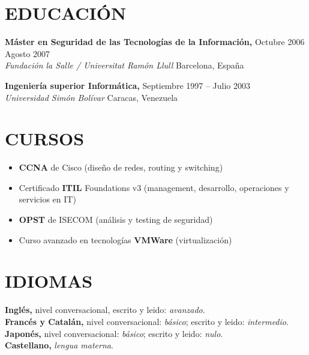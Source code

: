 \documentclass[line,margin]{res}
\begin{document}
\begin{resume}
\section{EDUCACI\'{O}N}
               \textbf{M\'{a}ster en Seguridad de las Tecnolog\'{i}as de la 
               Informaci\'{o}n,} \hfill Octubre 2006  Agosto 2007 \\
               \textit{Fundaci\'{o}n la Salle / Universitat Ram\'{o}n Llull} 
               \hfill Barcelona, Espa\~{n}a

               \textbf{Ingenier\'{i}a superior Inform\'{a}tica,} \hfill 
               Septiembre 1997 -- Julio 2003 \\
               \textit{Universidad Sim\'{o}n Bol\'{i}var} \hfill Caracas, 
               Venezuela



 
\section{CURSOS}
               \begin{itemize}  \itemsep 2pt %
               \item \textbf{CCNA} de Cisco (dise\~{n}o de redes, routing  y 
               switching)
               \item Certificado \textbf{ITIL} Foundations v3 (management, 
               desarrollo, operaciones y servicios en IT)
               \item \textbf{OPST} de ISECOM (an\'{a}lisis y testing de 
               seguridad)
               \item Curso avanzado en tecnolog\'{i}as \textbf{VMWare} 
               (virtualizaci\'{o}n)
               \end{itemize}


\section{IDIOMAS} 
               \textbf{Ingl\'{e}s,}
               nivel conversacional, escrito y leido: \textit{avanzado}.
               \\
               \textbf{Franc\'{e}s y Catal\'{a}n,}
               nivel conversacional: \textit{b\'{a}sico}; escrito y leido: 
               \textit{intermedio}.
               \\
               \textbf{Japon\'{e}s,}
               nivel conversacional: \textit{b\'{a}sico}; escrito y leido: 
               \textit{nulo}.
               \\
               \textbf{Castellano,}
               \textit{lengua materna}.
               

\end{resume}
\end{document}

